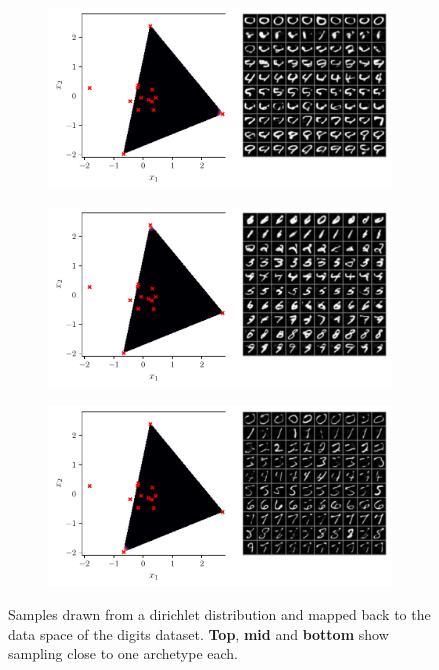 \begin{figure}[htpb]
	\centering
	\begin{subfigure}[htpb]{\textwidth}
		\centering
		\includegraphics[width=1\linewidth]{figures/samples/aa_emnist1.pdf}
	\end{subfigure}

	\begin{subfigure}[htpb]{\textwidth}
		\centering
		\includegraphics[width=1\linewidth]{figures/samples/aa_emnist2.pdf}
	\end{subfigure}

	\begin{subfigure}[htpb]{\textwidth}
		\centering
		\includegraphics[width=1\linewidth]{figures/samples/aa_emnist3.pdf}
	\end{subfigure}
	\caption{Samples drawn from a dirichlet distribution and mapped back to
		the data space of the digits dataset. \textbf{Top},
                \textbf{mid} and \textbf{bottom} show sampling
		close to one archetype each.}%
	\label{fig:aa_emnist_corners}
\end{figure}

